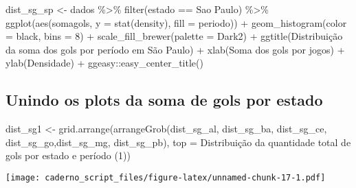 \documentclass[
]{article}
\newenvironment{Shaded}{\begin{snugshade}}{\end{snugshade}}
\newcommand{\AttributeTok}[1]{\textcolor[rgb]{0.77,0.63,0.00}{#1}}
\newcommand{\DecValTok}[1]{\textcolor[rgb]{0.00,0.00,0.81}{#1}}
\newcommand{\FunctionTok}[1]{\textcolor[rgb]{0.00,0.00,0.00}{#1}}
\newcommand{\NormalTok}[1]{#1}
\newcommand{\OtherTok}[1]{\textcolor[rgb]{0.56,0.35,0.01}{#1}}
\newcommand{\SpecialCharTok}[1]{\textcolor[rgb]{0.00,0.00,0.00}{#1}}
\newcommand{\StringTok}[1]{\textcolor[rgb]{0.31,0.60,0.02}{#1}}
\begin{document}
\begin{Shaded}
\begin{Highlighting}[]
\NormalTok{dist\_sg\_sp }\OtherTok{\textless{}{-}}\NormalTok{ dados }\SpecialCharTok{\%\textgreater{}\%} \FunctionTok{filter}\NormalTok{(estado }\SpecialCharTok{==} \StringTok{\textquotesingle{}Sao Paulo\textquotesingle{}}\NormalTok{) }\SpecialCharTok{\%\textgreater{}\%}
  \FunctionTok{ggplot}\NormalTok{(}\FunctionTok{aes}\NormalTok{(somagols, }\AttributeTok{y =} \FunctionTok{stat}\NormalTok{(density), }\AttributeTok{fill =}\NormalTok{ periodo)) }\SpecialCharTok{+} 
  \FunctionTok{geom\_histogram}\NormalTok{(}\AttributeTok{color =} \StringTok{\textquotesingle{}black\textquotesingle{}}\NormalTok{, }\AttributeTok{bins =} \DecValTok{8}\NormalTok{) }\SpecialCharTok{+} 
  \FunctionTok{scale\_fill\_brewer}\NormalTok{(}\AttributeTok{palette =} \StringTok{\textquotesingle{}Dark2\textquotesingle{}}\NormalTok{) }\SpecialCharTok{+}
  \FunctionTok{ggtitle}\NormalTok{(}\StringTok{\textquotesingle{}Distribuição da soma dos gols por período em São Paulo\textquotesingle{}}\NormalTok{) }\SpecialCharTok{+}
  \FunctionTok{xlab}\NormalTok{(}\StringTok{\textquotesingle{}Soma dos gols por jogos\textquotesingle{}}\NormalTok{) }\SpecialCharTok{+} \FunctionTok{ylab}\NormalTok{(}\StringTok{\textquotesingle{}Densidade\textquotesingle{}}\NormalTok{) }\SpecialCharTok{+}
\NormalTok{  ggeasy}\SpecialCharTok{::}\FunctionTok{easy\_center\_title}\NormalTok{() }
\end{Highlighting}
\end{Shaded}

\hypertarget{unindo-os-plots-da-soma-de-gols-por-estado}{%
\subsection{Unindo os plots da soma de gols por
estado}\label{unindo-os-plots-da-soma-de-gols-por-estado}}

\begin{Shaded}
\begin{Highlighting}[]
\NormalTok{dist\_sg1 }\OtherTok{\textless{}{-}} \FunctionTok{grid.arrange}\NormalTok{(}\FunctionTok{arrangeGrob}\NormalTok{(dist\_sg\_al, dist\_sg\_ba, dist\_sg\_ce, }
\NormalTok{                         dist\_sg\_go,dist\_sg\_mg, dist\_sg\_pb), }
                         \AttributeTok{top =} \StringTok{\textquotesingle{}Distribuição da quantidade total de gols por estado e período (1)\textquotesingle{}}\NormalTok{)}
\end{Highlighting}
\end{Shaded}

\texttt{[image: caderno\_script\_files/figure-latex/unnamed-chunk-17-1.pdf]}
\end{document}
